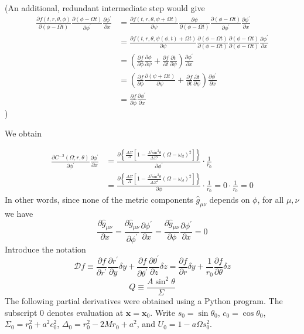 \documentclass[english]{article}
\begin{document}
(An additional, redundant intermediate step would give 
\begin{align*}
\frac{\partial f\left(t,r,\theta,\phi\right)}{\partial\left(\phi-\Omega t\right)}\frac{\partial\left(\phi-\Omega t\right)}{\partial\phi^{'}}\frac{\partial\phi^{'}}{\partial x} & =\frac{\partial f\left(t,r,\theta,\psi+\Omega t\right)}{\partial\psi}\frac{\partial\psi}{\partial\left(\phi-\Omega t\right)}\frac{\partial\left(\phi-\Omega t\right)}{\partial\phi^{'}}\frac{\partial\phi^{'}}{\partial x}\\
 & =\frac{\partial f\left(t,r,\theta,\psi\left(\phi,t\right)+\Omega t\right)}{\partial\psi}\frac{\partial\left(\phi-\Omega t\right)}{\partial\left(\phi-\Omega t\right)}\frac{\partial\left(\phi-\Omega t\right)}{\partial\left(\phi-\Omega t\right)}\frac{\partial\phi^{'}}{\partial x}\\
 & =\left(\frac{\partial f}{\partial\phi}\frac{\partial\phi}{\partial\psi}+\frac{\partial f}{\partial t}\frac{\partial t}{\partial\psi}\right)\frac{\partial\phi^{'}}{\partial x}\\
 & =\left(\frac{\partial f}{\partial\phi}\frac{\partial\left(\psi+\Omega t\right)}{\partial\psi}+\frac{\partial f}{\partial t}\frac{\partial t}{\partial\psi}\right)\frac{\partial\phi^{'}}{\partial x}\\
 & =\frac{\partial f}{\partial\phi}\frac{\partial\phi^{'}}{\partial x}
\end{align*}
)

We obtain

\begin{align*}
\frac{\partial C^{-2}\left(\Omega;r,\theta\right)}{\partial\phi^{'}}\frac{\partial\phi^{'}}{\partial x} & =\frac{\partial\left\{ \frac{\Delta\Sigma}{A}\left[1-\frac{A^{2}\text{sin}^{2}\theta}{\Delta\Sigma^{2}}\left(\Omega-\omega_{d}\right)^{2}\right]\right\} }{\partial\phi^{'}}\cdot\frac{1}{r_{0}}\\
 & =\frac{\partial\left\{ \frac{\Delta\Sigma}{A}\left[1-\frac{A^{2}\text{sin}^{2}\theta}{\Delta\Sigma^{2}}\left(\Omega-\omega_{d}\right)^{2}\right]\right\} }{\partial\phi}\cdot\frac{1}{r_{0}}=0\cdot\frac{1}{r_{0}}=0
\end{align*}
 In other words, since none of the metric components $\hat{g}_{\mu\nu}$
depends on $\phi$, for all $\mu,\nu$ we have 
\[
\frac{\partial\hat{g}_{\mu\nu}}{\partial x}=\frac{\partial\hat{g}_{\mu\nu}}{\partial\phi^{'}}\frac{\partial\phi^{'}}{\partial x}=\frac{\partial\hat{g}_{\mu\nu}}{\partial\phi}\frac{\partial\phi^{'}}{\partial x}=0
\]
 Introduce the notation 
\[
\mathcal{D}f\equiv\frac{\partial f}{\partial r^{'}}\frac{\partial r^{'}}{\partial y}\delta y+\frac{\partial f}{\partial\theta^{'}}\frac{\partial\theta^{'}}{\partial z}\delta z=\frac{\partial f}{\partial r}\delta y+\frac{1}{r_{0}}\frac{\partial f}{\partial\theta}\delta z
\]
 {}
\[
Q\equiv\frac{A\sin^{2}\theta}{\Sigma}
\]
 The following partial derivatives were obtained using a Python program.
The subscript $0$ denotes evaluation at $\boldsymbol{x}=\boldsymbol{x}_{0}$.
Write $s_{0}=\sin\theta_{0}$, $c_{0}=\cos\theta_{0}$, $\Sigma_{0}=r^{2}_{0}+a^{2}c^{2}_{0}$,
$\Delta_{0}=r^{2}_{0}-2Mr_{0}+a^{2}$, and $U_{0}=1-a\Omega s^{2}_{0}$.
\end{document}
